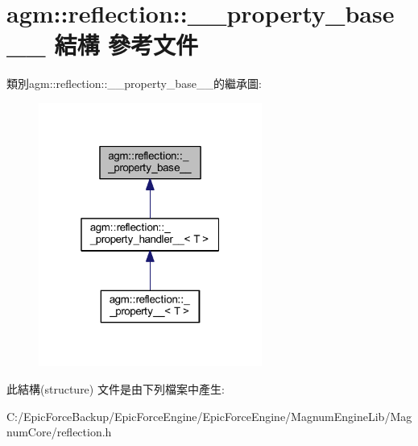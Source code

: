 \hypertarget{structagm_1_1reflection_1_1____property__base____}{}\section{agm\+:\+:reflection\+:\+:\+\_\+\+\_\+property\+\_\+base\+\_\+\+\_\+ 結構 參考文件}
\label{structagm_1_1reflection_1_1____property__base____}


類別agm\+:\+:reflection\+:\+:\+\_\+\+\_\+property\+\_\+base\+\_\+\+\_\+的繼承圖\+:\nopagebreak
\begin{figure}[H]
\begin{center}
\leavevmode
\includegraphics[width=208pt]{structagm_1_1reflection_1_1____property__base______inherit__graph}
\end{center}
\end{figure}


此結構(structure) 文件是由下列檔案中產生\+:\begin{DoxyCompactItemize}
\item 
C\+:/\+Epic\+Force\+Backup/\+Epic\+Force\+Engine/\+Epic\+Force\+Engine/\+Magnum\+Engine\+Lib/\+Magnum\+Core/reflection.\+h\end{DoxyCompactItemize}
